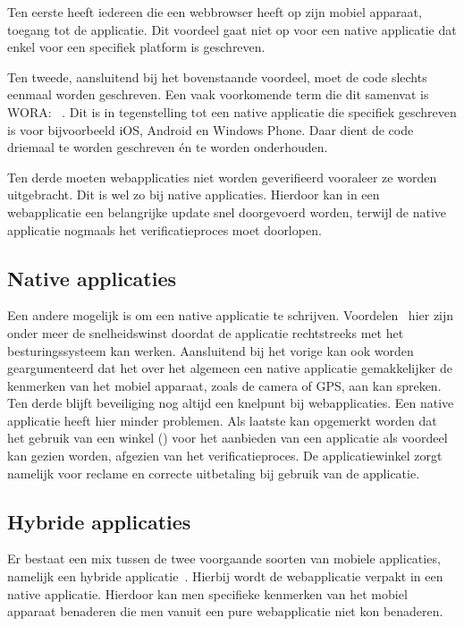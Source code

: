 Ten eerste heeft iedereen die een webbrowser heeft op zijn mobiel apparaat, toegang tot de applicatie.  Dit voordeel gaat niet op voor een native applicatie dat enkel voor een specifiek platform is geschreven. 

Ten tweede, aansluitend bij het bovenstaande voordeel, moet de code slechts eenmaal worden geschreven. Een vaak voorkomende term die dit samenvat is WORA: ~\cite{Hales2012}. Dit is in tegenstelling tot een native applicatie die specifiek geschreven is voor bijvoorbeeld iOS, Android en Windows Phone. Daar dient de code driemaal te worden geschreven \'en te worden onderhouden.

Ten derde moeten webapplicaties niet worden geverifieerd vooraleer ze worden uitgebracht. Dit is wel zo bij native applicaties. Hierdoor kan in een webapplicatie een belangrijke update snel doorgevoerd worden, terwijl de native applicatie nogmaals het verificatieproces moet doorlopen.

\subsection{Native applicaties}
Een andere mogelijk is om een native applicatie te schrijven. Voordelen~\cite{Accenture2012} hier zijn onder meer de snelheidswinst doordat de applicatie rechtstreeks met het besturingssysteem kan werken. Aansluitend bij het vorige kan ook worden geargumenteerd dat het over het algemeen een native applicatie gemakkelijker de kenmerken van het mobiel apparaat, zoals de camera of GPS, aan kan spreken. Ten derde blijft beveiliging nog altijd een knelpunt bij webapplicaties. Een native applicatie heeft hier minder problemen. Als laatste kan opgemerkt worden dat het gebruik van een winkel () voor het aanbieden van een applicatie als voordeel kan gezien worden, afgezien van het verificatieproces. De applicatiewinkel zorgt namelijk voor reclame en correcte uitbetaling bij gebruik van de applicatie.

\subsection{Hybride applicaties}
Er bestaat een mix tussen de twee voorgaande soorten van mobiele applicaties, namelijk een hybride applicatie~\cite{Accenture2012}. Hierbij wordt de webapplicatie verpakt in een native applicatie. Hierdoor kan men specifieke kenmerken van het mobiel apparaat benaderen die men vanuit een pure webapplicatie niet kon benaderen.

